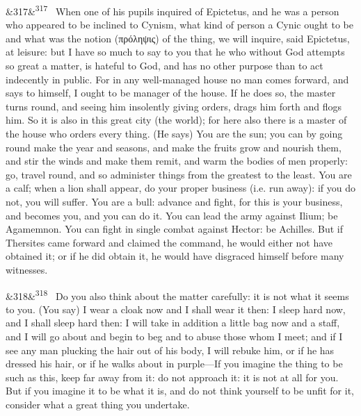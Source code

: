 \documentclass[12pt]{article}
\newcommand{\para}[1][]{\par\noindent\ifx&#1&\else\textsuperscript{\footnotesize #1}~\fi}
\begin{document}
\para[317] When one of his pupils inquired of Epictetus, and he was a person who appeared to be inclined to Cynism, what kind of person a Cynic ought to be and what was the notion (πρόληψις) of the thing, we will inquire, said Epictetus, at leisure: but I have so much to say to you that he who without God attempts so great a matter, is hateful to God, and has no other purpose than to act indecently in public. For in any well-managed house no man comes forward, and says to himself, I ought to be manager of the house. If he does so, the master turns round, and seeing him insolently giving orders, drags him forth and flogs him. So it is also in this great city (the world); for here also there is a master of the house who orders every thing. (He says) You are the sun; you can by going round make the year and seasons, and make the fruits grow and nourish them, and stir the winds and make them remit, and warm the bodies of men properly: go, travel round, and so administer things from the greatest to the least. You are a calf; when a lion shall appear, do your proper business (i.e. run away): if you do not, you will suffer. You are a bull: advance and fight, for this is your business, and becomes you, and you can do it. You can lead the army against Ilium; be Agamemnon. You can fight in single combat against Hector: be Achilles. But if Thersites came forward and claimed the command, he would either not have obtained it; or if he did obtain it, he would have disgraced himself before many witnesses.

\para[318] Do you also think about the matter carefully: it is not what it seems to you. (You say) I wear a cloak now and I shall wear it then: I sleep hard now, and I shall sleep hard then: I will take in addition a little bag now and a staff, and I will go about and begin to beg and to abuse those whom I meet; and if I see any man plucking the hair out of his body, I will rebuke him, or if he has dressed his hair, or if he walks about in purple—If you imagine the thing to be such as this, keep far away from it: do not approach it: it is not at all for you. But if you imagine it to be what it is, and do not think yourself to be unfit for it, consider what a great thing you undertake.
\end{document}
